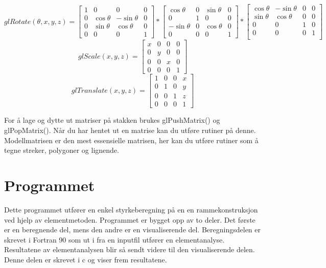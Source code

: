 \documentclass[10pt,a4paper, norsk]{article}
\begin{document}
\begin{equation}
glRotate(\theta	,x,y,z)  = \begin{bmatrix}
1 & 0&  0 &0 \\
0   &\cos \theta &  -\sin \theta &0\\
0 &  \sin \theta   & \cos \theta &0\\
0&0&0&1
\end{bmatrix} * \begin{bmatrix}
\cos \theta  & 0 &  \sin \theta &0\\
0  & 1  & 0 & 0\\
-\sin \theta &  0 &  \cos \theta  &0\\
0&0&0&1
\end{bmatrix} 
*
\begin{bmatrix}
\cos \theta & -\sin \theta &   0 &0\\[3pt]
\sin \theta & \cos \theta  & 0 &0\\[3pt]
0 &0 & 1 &0\\
0&0&0&1\\
\end{bmatrix}
\end{equation}
\begin{equation}
glScale(x,y,z)=
\begin{bmatrix}
x &0&0&0\\
0&y&0&0\\
0&0&x&0\\
0&0&0&1
\end{bmatrix}
\end{equation}
\begin{equation}
glTranslate(x,y,z)=
\begin{bmatrix}
1 &0&0&x\\
0&1&0&y\\
0&0&1&z\\
0&0&0&1
\end{bmatrix}
\end{equation}

For å lage og dytte ut matriser på stakken brukes glPushMatrix() og glPopMatrix(). Når du har hentet ut en matrise kan du utføre rutiner på denne. Modellmatrisen er den mest essensielle matrisen, her kan du utføre rutiner som å tegne streker, polygoner og lignende. 




\section{Programmet} 
Dette programmet utfører en enkel styrkeberegning på en en rammekonstruksjon ved hjelp av elementmetoden. Programmet er bygget opp av to deler. Det første er en beregnende del, mens den andre er en visualiserende del. Beregningsdelen er skrevet i  Fortran 90 som ut i fra en inputfil utfører en elementanalyse. Resultatene av elementanalysen blir så sendt videre til den visualiserende delen. Denne delen er skrevet i c og viser frem resultatene. 
\end{document}
